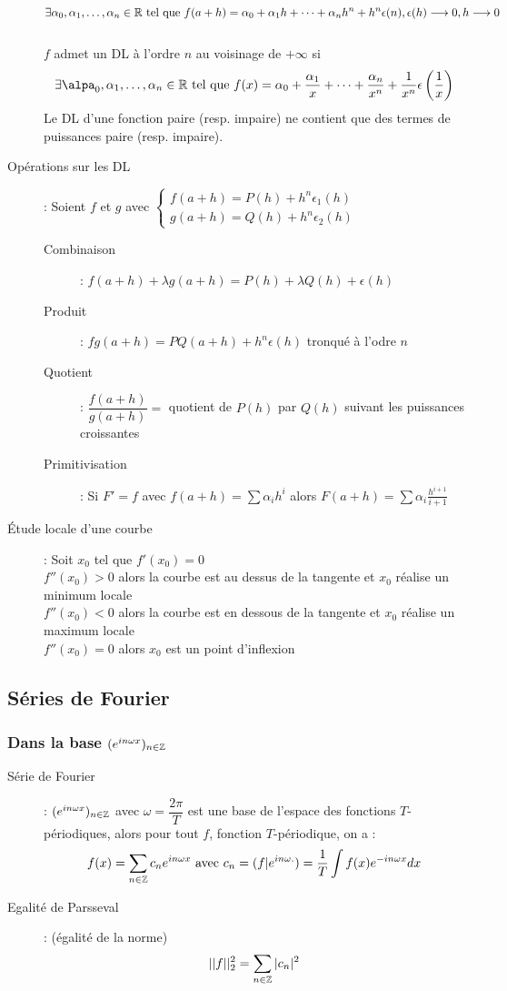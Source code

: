 \begin{description}
    \[ \exists\alpha_0 , \alpha_1 , \dots, \alpha_n \in\mathbb{R}\textrm{ tel que } f(a + h) = \alpha_0 + \alpha_1 h + \dots + \alpha_n h^n + h^n \epsilon(n), \epsilon(h)\longrightarrow 0, h\longrightarrow 0 \]
    \\$f$ admet un DL à l’ordre $n$ au voisinage de $+\infty$ si
    \[ \exists\alpa_0,\alpha_1,\dots,\alpha_n\in\R\tq f(x)=\alpha_0+\frac{\alpha_1}{x}+\dots+\frac{\alpha_n}{x^n}+\frac{1}{x^n}\epsilon\left(\frac{1}{x}\right) \]
    Le DL d’une fonction paire (resp. impaire) ne contient que des termes de puissances paire (resp. impaire).
\item[Opérations sur les DL] : Soient $f$ et $g$ avec
    $\begin{cases}
        f(a+h)=P(h)+h^n\epsilon_1(h)\\
        g(a+h)=Q(h)+h^n\epsilon_2(h)
    \end{cases}$
\begin{description}
    \item[Combinaison] : $f(a+h)+\lambda g(a+h)=P(h)+\lambda Q(h)+\epsilon(h)$
    \item[Produit] : $fg(a+h)=PQ(a+h)+h^n\epsilon(h)$ tronqué à l'odre $n$
    \item[Quotient] : $\dfrac{f(a+h)}{g(a+h)}=$ quotient de $P(h)$ par $Q(h)$ suivant les puissances croissantes
    \item[Primitivisation] : Si $F'=f$ avec $f(a+h)=\sum\alpha_i h^i$ alors $F(a+h)=\sum\alpha_i\frac{h^{i+1}}{i+1}$
\end{description}
\item[Étude locale d'une courbe] : Soit $x_0$ tel que $f'(x_0 ) = 0$
\\$f''(x_0) > 0$ alors la courbe est au dessus de la tangente et $x_0$ réalise un minimum locale
\\$f''(x_0) < 0$ alors la courbe est en dessous de la tangente et $x_0$ réalise un maximum locale
\\$f''(x_0) = 0$ alors $x_0$ est un point d’inflexion
\end{description}
\subsection{Séries de Fourier}
\subsubsection{Dans la base $(e^{in\omega x})_{n\in\mathbb{Z}}$}
\begin{description}
\item[Série de Fourier] : $(e^{in\omega x})_{n\in\mathbb{Z}}$ avec $\omega=\dfrac{2\pi}{T}$ est une base de l'espace des fonctions $T$-périodiques,
    alors pour tout $f$, fonction $T$-périodique, on a :
    \[
        f(x)=\sum_{n\in\mathbb{Z}}c_ne^{in\omega x}
        \textrm{ avec }
        c_n=(f|e^{in\omega .})=\frac{1}{T}\int f(x)e^{-in\omega x}dx
    \]
\item[Egalité de Parsseval] : (égalité de la norme)
    \[
        ||f||_2^2=\sum_{n\in\mathbb{Z}}|c_n|^2
    \]
\end{description}
